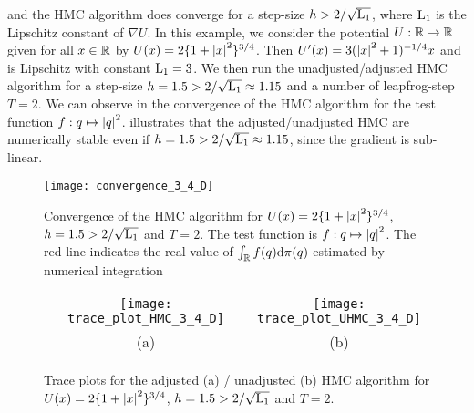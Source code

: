   and the HMC algorithm does converge for a step-size $h > 2 /
  \sqrt{\mathrm{L}_1}$, where $\mathrm{L}_1$ is the Lipschitz constant of $\nabla U$.
  In this example, we consider the potential $U : \mathbb{R} \to \mathbb{R}$ given
  for all $x \in \mathbb{R}$ by $U(x) = 2 \lbrace 1+\left\vert x \right\vert^2 \rbrace^{3/4}$. Then
  $U'(x) = 3(\left\vert x \right\vert^2 +1)^{-1/4}x$ and is Lipschitz with constant
  $\mathrm{L}_1 = 3$. We then run the unadjusted/adjusted HMC algorithm for a
  step-size $h =1.5 > 2/\sqrt{\mathrm{L}_1} \approx 1.15$ and a number of
  leapfrog-step $T =2$.  We can observe in
   the convergence of the HMC
  algorithm for the test function $f : q \mapsto \left\vert q \right\vert^2$.
   illustrates that the
  adjusted/unadjusted HMC are numerically stable even if $h =1.5 > 2/\sqrt{\mathrm{L}_1} \approx 1.15$, since the gradient
  is sub-linear.


\begin{figure}[h]
	\begin{center}		
		\texttt{[image: convergence\_3\_4\_D]}
\end{center}
	\caption{Convergence of the HMC algorithm for $U(x) = 2
  \lbrace 1+\left\vert x \right\vert^2 \rbrace^{3/4}$, $h =1.5 > 2/\sqrt{\mathrm{L}_1}$ and $T=2$. The test function is $f : q \mapsto \left\vert q \right\vert^2$. The red line indicates the real value of $\int_{\mathbb{R}} f(q) \mathrm{d} \pi(q)$ estimated by numerical integration}
	\label{fig:experiments_convergence}
\end{figure}


\begin{figure}[h]
	\begin{center}
	\begin{tabular}{p{0.1cm}cp{0.1cm}c}
&		\texttt{[image: trace\_plot\_HMC\_3\_4\_D]}
		& &
		\texttt{[image: trace\_plot\_UHMC\_3\_4\_D]}\\
& (a) & & (b)
	\end{tabular}
\end{center}
	\caption{Trace plots for the adjusted (a) / unadjusted (b) HMC algorithm for $U(x) = 2
  \lbrace 1+\left\vert x \right\vert^2 \rbrace^{3/4}$, $h =1.5 > 2/\sqrt{\mathrm{L}_1}$ and $T=2$.}
	\label{fig:experiments_stability}
\end{figure}


